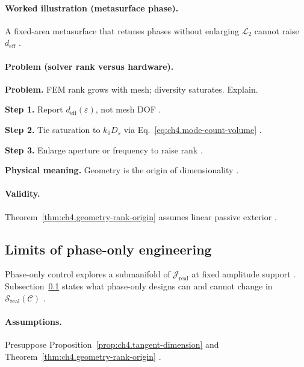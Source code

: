 \paragraph{Worked illustration (metasurface phase).}
A fixed-area metasurface that retunes phases without enlarging \(\mathcal{L}_{2}\) cannot raise \(d_{\mathrm{eff}}\)
\cite{stratton1941,harrington2001,hansen1988}.

\paragraph{Problem (solver rank versus hardware).}
\textbf{Problem.} FEM rank grows with mesh; diversity saturates. Explain.

\textbf{Step 1.} Report \(d_{\mathrm{eff}}(\varepsilon)\), not mesh DOF \cite{harrington2001,devaney2004}.

\textbf{Step 2.} Tie saturation to \(k_{0}D_{s}\) via Eq.~\eqref{eq:ch4.mode-count-volume} \cite{jackson1999,hansen1988}.

\textbf{Step 3.} Enlarge aperture or frequency to raise rank \cite{stratton1941}.

\textbf{Physical meaning.} Geometry is the origin of dimensionality \cite{stratton1941}.

\paragraph{Validity.}
Theorem~\ref{thm:ch4.geometry-rank-origin} assumes linear passive exterior \cite{stratton1941}.


\subsection{Limits of phase-only engineering}
\label{sec:ch492}

Phase-only control explores a submanifold of \(\mathcal{J}_{\mathrm{real}}\) at fixed amplitude support \cite{stratton1941,harrington2001}.
Subsection~\ref{sec:ch492} states what phase-only designs can and cannot change in \(\mathcal{S}_{\mathrm{real}}(\mathcal{C})\)
\cite{devaney2004,hansen1988}.

\paragraph{Assumptions.}
Presuppose Proposition~\ref{prop:ch4.tangent-dimension} and Theorem~\ref{thm:ch4.geometry-rank-origin}
\cite{stratton1941,harrington2001,devaney2004}.

